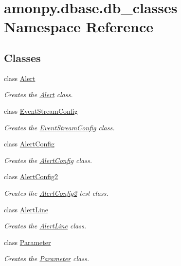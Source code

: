 \hypertarget{namespaceamonpy_1_1dbase_1_1db__classes}{\section{amonpy.\-dbase.\-db\-\_\-classes Namespace Reference}
\label{namespaceamonpy_1_1dbase_1_1db__classes}
}
\subsection*{Classes}
\begin{DoxyCompactItemize}
\item 
class \hyperlink{classamonpy_1_1dbase_1_1db__classes_1_1_alert}{Alert}
\begin{DoxyCompactList}\small\item\em Creates the \hyperlink{classamonpy_1_1dbase_1_1db__classes_1_1_alert}{Alert} class. \end{DoxyCompactList}\item 
class \hyperlink{classamonpy_1_1dbase_1_1db__classes_1_1_event_stream_config}{Event\-Stream\-Config}
\begin{DoxyCompactList}\small\item\em Creates the \hyperlink{classamonpy_1_1dbase_1_1db__classes_1_1_event_stream_config}{Event\-Stream\-Config} class. \end{DoxyCompactList}\item 
class \hyperlink{classamonpy_1_1dbase_1_1db__classes_1_1_alert_config}{Alert\-Config}
\begin{DoxyCompactList}\small\item\em Creates the \hyperlink{classamonpy_1_1dbase_1_1db__classes_1_1_alert_config}{Alert\-Config} class. \end{DoxyCompactList}\item 
class \hyperlink{classamonpy_1_1dbase_1_1db__classes_1_1_alert_config2}{Alert\-Config2}
\begin{DoxyCompactList}\small\item\em Creates the \hyperlink{classamonpy_1_1dbase_1_1db__classes_1_1_alert_config2}{Alert\-Config2} test class. \end{DoxyCompactList}\item 
class \hyperlink{classamonpy_1_1dbase_1_1db__classes_1_1_alert_line}{Alert\-Line}
\begin{DoxyCompactList}\small\item\em Creates the \hyperlink{classamonpy_1_1dbase_1_1db__classes_1_1_alert_line}{Alert\-Line} class. \end{DoxyCompactList}\item 
class \hyperlink{classamonpy_1_1dbase_1_1db__classes_1_1_parameter}{Parameter}
\begin{DoxyCompactList}\small\item\em Creates the \hyperlink{classamonpy_1_1dbase_1_1db__classes_1_1_parameter}{Parameter} class. \end{DoxyCompactList}\end{DoxyCompactItemize}
